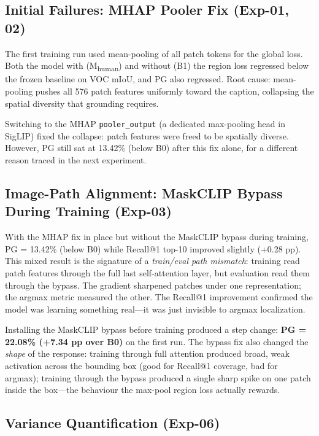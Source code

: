 \documentclass{article}
\begin{document}
\subsection{Initial Failures: MHAP Pooler Fix (Exp-01, 02)}
\label{sec:initial}

The first training run used mean-pooling of all patch tokens for the global
loss. Both the model with (M\textsubscript{human}) and without (B1) the region
loss regressed below the frozen baseline on VOC mIoU, and PG also regressed.
Root cause: mean-pooling pushes all 576 patch features uniformly toward the
caption, collapsing the spatial diversity that grounding requires.

Switching to the MHAP \texttt{pooler\_output} (a dedicated max-pooling head in
SigLIP) fixed the collapse: patch features were freed to be spatially diverse.
However, PG still sat at 13.42\% (below B0) after this fix alone, for a
different reason traced in the next experiment.

\subsection{Image-Path Alignment: MaskCLIP Bypass During Training (Exp-03)}
\label{sec:img-fix}

With the MHAP fix in place but without the MaskCLIP bypass during training, PG
= 13.42\% (below B0) while Recall@1 top-10 improved slightly (+0.28 pp). This
mixed result is the signature of a \emph{train/eval path mismatch}: training
read patch features through the full last self-attention layer, but evaluation
read them through the bypass. The gradient sharpened patches under one
representation; the argmax metric measured the other. The Recall@1 improvement
confirmed the model was learning something real---it was just invisible to
argmax localization.

Installing the MaskCLIP bypass before training produced a step change:
\textbf{PG = 22.08\% (+7.34 pp over B0)} on the first run. The bypass fix also
changed the \emph{shape} of the response: training through full attention
produced broad, weak activation across the bounding box (good for Recall@1
coverage, bad for argmax); training through the bypass produced a single sharp
spike on one patch inside the box---the behaviour the max-pool region loss
actually rewards.

\subsection{Variance Quantification (Exp-06)}
\label{sec:variance}
\end{document}

